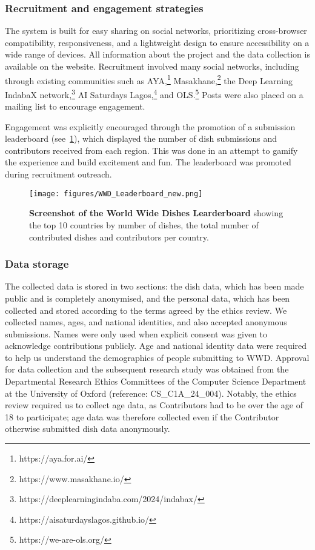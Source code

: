 

\subsubsection{Recruitment and engagement strategies}
The system is built for easy sharing on social networks, prioritizing cross-browser compatibility, responsiveness, and a lightweight design to ensure accessibility on a wide range of devices. All information about the project and the data collection is available on the website. Recruitment involved many social networks, including through existing communities such as AYA,\footnote{https://aya.for.ai/} Masakhane,\footnote{https://www.masakhane.io/} the Deep Learning IndabaX network,\footnote{https://deeplearningindaba.com/2024/indabax/} AI Saturdays Lagos,\footnote{https://aisaturdayslagos.github.io/} and OLS.\footnote{https://we-are-ols.org/} Posts were also placed on a mailing list to encourage engagement.

Engagement was explicitly encouraged through the promotion of a submission leaderboard (see~\cref{fig:leaderboard}),
which displayed the number of dish submissions and contributors received from each region. This was done in an attempt to gamify the experience and build excitement and fun. The leaderboard was promoted during recruitment outreach. 

\begin{figure}[t]
    \centering
    \texttt{[image: figures/WWD\_Leaderboard\_new.png]}
    \caption{\textbf{Screenshot of the World Wide Dishes  Learderboard} showing the top 10 countries by number of dishes, the total number of contributed dishes and contributors per country.}
    \label{fig:leaderboard}
\end{figure}

\subsubsection{Data storage}  The collected data is stored in two sections: the dish data, which has been made public and is completely anonymised, and the personal data, which has been collected and stored according to the terms agreed by the ethics review. We collected names, ages, and national identities, and also accepted anonymous submissions. Names were only used when explicit consent was given to acknowledge contributions publicly. Age and national identity data were required to help us understand the demographics of people submitting to \textsc{WWD}. Approval for data collection and the subsequent research study was obtained from the Departmental Research Ethics Committees of the Computer Science Department at the University of Oxford (reference: CS\_C1A\_24\_004). Notably, the ethics review required us to collect age data, as Contributors had to be over the age of 18 to participate; age data was therefore collected even if the Contributor otherwise submitted dish data anonymously.


